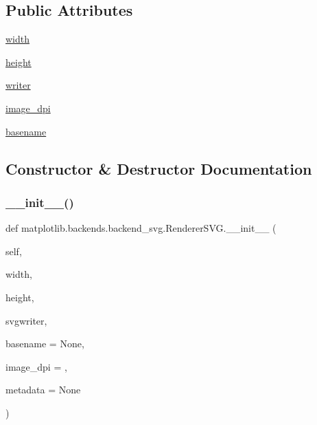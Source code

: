 \subsection*{Public Attributes}
\begin{DoxyCompactItemize}
\item 
\hyperlink{classmatplotlib_1_1backends_1_1backend__svg_1_1RendererSVG_a1266911c6b66caa35a09c02b4becb44e}{width}
\item 
\hyperlink{classmatplotlib_1_1backends_1_1backend__svg_1_1RendererSVG_a7929ca1ac4d24d43339558dc14d813f9}{height}
\item 
\hyperlink{classmatplotlib_1_1backends_1_1backend__svg_1_1RendererSVG_af8f8862c6e64f24d8edb3f312253b776}{writer}
\item 
\hyperlink{classmatplotlib_1_1backends_1_1backend__svg_1_1RendererSVG_ae0ea06df53e9740a476c661f92fbddc5}{image\+\_\+dpi}
\item 
\hyperlink{classmatplotlib_1_1backends_1_1backend__svg_1_1RendererSVG_a4e284a50c90f9a6925d77b55e91f13f2}{basename}
\end{DoxyCompactItemize}


\subsection{Constructor \& Destructor Documentation}
\mbox{\label{classmatplotlib_1_1backends_1_1backend__svg_1_1RendererSVG_a987fbfe48efa00559820bfb58c465cfa}} 
\subsubsection{\texorpdfstring{\+\_\+\+\_\+init\+\_\+\+\_\+()}{\_\_init\_\_()}}
{\footnotesize\ttfamily def matplotlib.\+backends.\+backend\+\_\+svg.\+Renderer\+S\+V\+G.\+\_\+\+\_\+init\+\_\+\+\_\+ (\begin{DoxyParamCaption}\item[{}]{self,  }\item[{}]{width,  }\item[{}]{height,  }\item[{}]{svgwriter,  }\item[{}]{basename = {\ttfamily None},  }\item[{}]{image\+\_\+dpi = {},  }\item[{}]{metadata = {\ttfamily None} }\end{DoxyParamCaption})}



